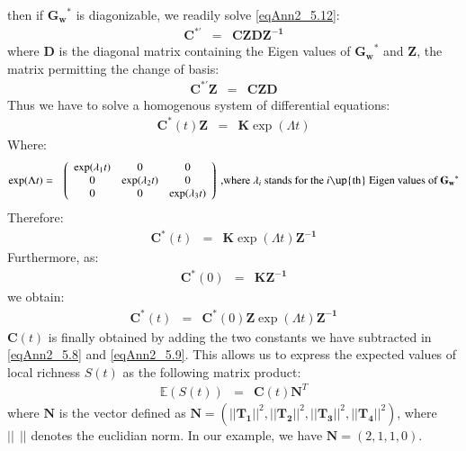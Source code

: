 then if $\mathbf{G_w}^*$ is diagonizable, we readily solve \eqref{eqAnn2_5.12}:
\begin{eqnarray}
\mathbf{C}^{*'}&=&\mathbf{CZDZ^{-1}}
\end{eqnarray}
where $\mathbf{D}$ is the diagonal matrix containing the Eigen values of $\mathbf{G_w}^*$ and $\mathbf{Z}$, the matrix permitting the change of basis:
\begin{eqnarray}
\mathbf{C}^{*'}\mathbf{Z}&=&\mathbf{CZD}
\end{eqnarray}
Thus we have to solve a homogenous system of differential equations:
\begin{eqnarray}
\mathbf{C}^{*}(t)\mathbf{Z}&=&\mathbf{K}\exp(\Lambda t)
\end{eqnarray}
Where:
\begin{eqnarray}
\nonumber \exp(\Lambda t)&=&
\left(\begin{array}{cccc}
\exp(\lambda_1t) & 0 & 0 \\
0 & \exp(\lambda_2t) & 0  \\
0  & 0 & \exp(\lambda_3t)
\end{array}\right)
\text{~,where $\lambda_i$ stands for the $i$\up{th} Eigen values of $\mathbf{G_w}^*$}
\end{eqnarray}
Therefore:
\begin{eqnarray}
\mathbf{C}^{*}(t)&=&\mathbf{K}\exp(\Lambda t)\mathbf{Z^{-1}}
\end{eqnarray}
Furthermore, as:
\begin{eqnarray}
\mathbf{C}^{*}(0)&=&\mathbf{KZ^{-1}}
\end{eqnarray}
we obtain:
\begin{eqnarray}
\mathbf{C}^{*}(t)&=&\mathbf{C}^{*}(0)\mathbf{Z}\exp(\Lambda t)\mathbf{Z^{-1}}
\end{eqnarray}
$\mathbf{C}(t)$ is finally obtained by adding the two constants we have subtracted in \eqref{eqAnn2_5.8} and \eqref{eqAnn2_5.9}. This allows us to express the expected values of local richness $S(t)$ as the following matrix product:
\begin{eqnarray}
\label{eqAnn2_5.19} \mathbb{E}({S}(t))&=&\mathbf{C}(t)\mathbf{N}^T
\end{eqnarray}
where $\mathbf{N}$ is the vector defined as  $\mathbf{N}=(||\mathbf{T_1}||^2, ||\mathbf{T_2}||^2, ||\mathbf{T_3}||^2, ||\mathbf{T_4}||^2)$, where $||~~||$ denotes the euclidian norm. In our example, we have $\mathbf{N}=(2,1,1,0)$.


